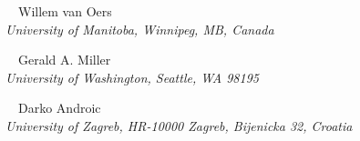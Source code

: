 \begin{center}
\vspace{10px}

{~~Willem van Oers}\\
\ls
{\normalsize\it{University of Manitoba, Winnipeg, MB, Canada}}

\vspace{10px}


{~~Gerald A. Miller}\\
\ls
{\normalsize\it{University of Washington, Seattle, WA 98195}}

\vspace{10px}


{~~Darko Androic}\\
\ls
{\normalsize\it{University of Zagreb, HR-10000 Zagreb, Bijenicka 32, Croatia}}
\ks

%



\end{center}


\setcounter{footnote}{0}
